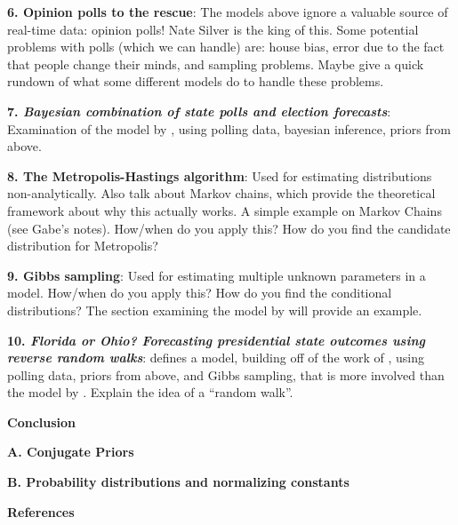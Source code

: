 \documentclass[12pt]{article}
\begin{document}
\textbf{6. Opinion polls to the rescue}: The models above ignore a valuable source of real-time data: opinion polls! Nate Silver \citeyearpar{Silver:2012aa} is the king of this. Some potential problems with polls (which we can handle) are: house bias, error due to the fact that people change their minds, and sampling problems. Maybe give a quick rundown of what some different models do to handle these problems.

\textbf{7. \emph{Bayesian combination of state polls and election forecasts}}: Examination of the model by \cite{Lock:2010aa}, using polling data, bayesian inference, priors from above.

\textbf{8. The Metropolis-Hastings algorithm}: Used for estimating distributions non-analytically. Also talk about Markov chains, which provide the theoretical framework about why this actually works. A simple example on Markov Chains (see Gabe's notes). How/when do you apply this? How do you find the candidate distribution for Metropolis?

\textbf{9. Gibbs sampling}: Used for estimating multiple unknown parameters in a model. How/when do you apply this? How do you find the conditional distributions? The section examining the model by \cite{Strauss:2007aa} will provide an example.

\textbf{10. \emph{{Florida} or {Ohio}? {F}orecasting presidential state outcomes using reverse random walks}}: \cite{Strauss:2007aa} defines a model, building off of the work of \cite{Jackman:2005aa}, using polling data, priors from above, and Gibbs sampling, that is more involved than the model by \cite{Lock:2010aa}. Explain the idea of a ``random walk''.

\textbf{Conclusion}

\textbf{A. Conjugate Priors}

\textbf{B. Probability distributions and normalizing constants}

\textbf{References}


\end{document}
